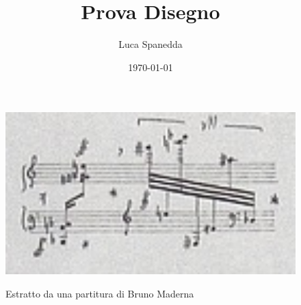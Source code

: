 \documentclass{article}
\begin{document}
\title{Prova Disegno}
\author{Luca Spanedda}
\date{\today}
\maketitle


\begin{figure}[h!] %
\begin{center} %

  \includegraphics[width=12cm]{serenata.jpg}\\ 
  \caption{Estratto da una partitura di Bruno Maderna} 
\end{center} %
\end{figure} %
\end{document}
